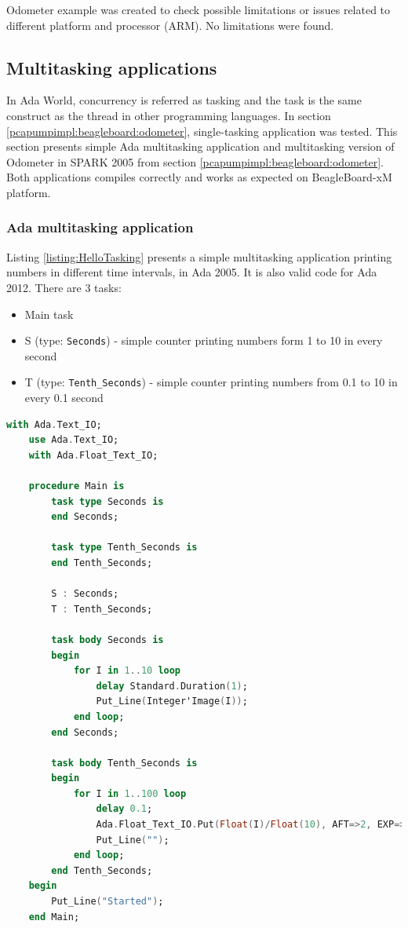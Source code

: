 Odometer example was created to check possible limitations or issues related to different platform and processor (ARM). No limitations were found.


\subsection{Multitasking applications}
\label{pcapumpimpl:beagleboard:multitasking}

In Ada World, concurrency is referred as tasking and the task is the same construct as the thread in other programming languages. In section \ref{pcapumpimpl:beagleboard:odometer}, single-tasking application was tested. This section presents simple Ada multitasking application and multitasking version of Odometer in SPARK 2005 from section \ref{pcapumpimpl:beagleboard:odometer}. Both applications compiles correctly and works as expected on BeagleBoard-xM platform.

\subsubsection{Ada multitasking application}

Listing \ref{listing:HelloTasking} presents a simple multitasking application printing numbers in different time intervals, in Ada 2005. It is also valid code for Ada 2012. There are 3 tasks:
\begin{itemize}
    \item Main task
    \item S (type: \lstinline{Seconds}) - simple counter printing numbers form 1 to 10 in every second
    \item T (type: \lstinline{Tenth_Seconds}) - simple counter printing numbers from 0.1 to 10 in every 0.1 second
\end{itemize}

\begin{lstlisting}[language=ada, frame=single, gobble=0, caption={Simple multitask application in Ada}]
	with Ada.Text_IO;
	use Ada.Text_IO;
	with Ada.Float_Text_IO;

	procedure Main is
	    task type Seconds is
	    end Seconds;

	    task type Tenth_Seconds is
	    end Tenth_Seconds;

	    S : Seconds;
	    T : Tenth_Seconds;

	    task body Seconds is
	    begin
	        for I in 1..10 loop
	            delay Standard.Duration(1);
	            Put_Line(Integer'Image(I));
	        end loop;
	    end Seconds;

	    task body Tenth_Seconds is
	    begin
	        for I in 1..100 loop            
	            delay 0.1;            
	            Ada.Float_Text_IO.Put(Float(I)/Float(10), AFT=>2, EXP=>0);
	            Put_Line("");
	        end loop;
	    end Tenth_Seconds;
	begin
	    Put_Line("Started");
	end Main;
\end{lstlisting} 
\label{listing:HelloTasking}

